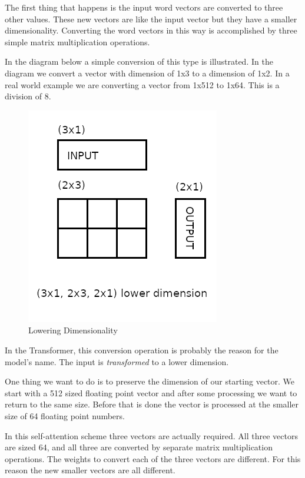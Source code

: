 The first thing that happens is the input word vectors are converted to three other values. These new vectors are like the input vector but they have a smaller dimensionality. Converting the word vectors in this way is accomplished by three simple matrix multiplication operations.

In the diagram below a simple conversion of this type is illustrated. In the diagram we convert a vector with dimension of 1x3 to a dimension of 1x2. In a real world example we are converting a vector from 1x512 to 1x64. This is a division of 8.



\begin{figure}[H]
	\begin{center}
		
	
	\includegraphics[scale=0.5]{diagram-mat01}
\end{center}
	\caption[Lowering Dimensionality]{Lowering Dimensionality}
	

\end{figure}

In the Transformer, this conversion operation is probably the reason for the model's name. The input is \textit{transformed} to a lower dimension. 

One thing we want to do is to preserve the dimension of our starting vector. We start with a 512 sized floating point vector and after some processing we want to return to the same size. Before that is done the vector is processed at the smaller size of 64 floating point numbers. 

In this self-attention scheme three vectors are actually required. All three vectors are sized 64, and all three are converted by separate matrix multiplication operations. The weights to convert each of the three vectors are different. For this reason the new smaller vectors are all different.

